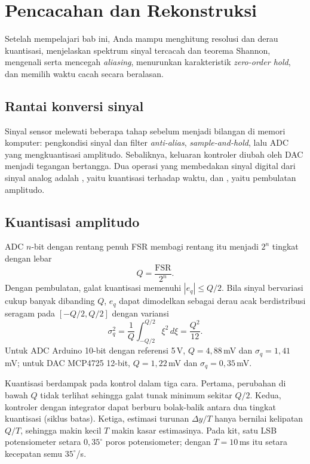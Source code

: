 \chapter{Pencacahan dan Rekonstruksi}
\label{bab:pencacahan}

\begin{tujuan}
	Setelah mempelajari bab ini, Anda mampu menghitung resolusi dan derau kuantisasi, menjelaskan spektrum sinyal tercacah dan teorema Shannon, mengenali serta mencegah \textit{aliasing}, menurunkan karakteristik \textit{zero-order hold}, dan memilih waktu cacah secara beralasan.
\end{tujuan}

\section{Rantai konversi sinyal}
Sinyal sensor melewati beberapa tahap sebelum menjadi bilangan di memori komputer: pengkondisi sinyal dan filter \textit{anti-alias}, \textit{sample-and-hold}, lalu ADC yang mengkuantisasi amplitudo. Sebaliknya, keluaran kontroler diubah oleh DAC menjadi tegangan bertangga. Dua operasi yang membedakan sinyal digital dari sinyal analog adalah , yaitu kuantisasi terhadap waktu, dan , yaitu pembulatan amplitudo.

\section{Kuantisasi amplitudo}
ADC $n$-bit dengan rentang penuh FSR membagi rentang itu menjadi $2^n$ tingkat dengan lebar
\begin{equation}
	Q = \frac{\text{FSR}}{2^n}.
\end{equation}
Dengan pembulatan, galat kuantisasi memenuhi $|e_q| \le Q/2$. Bila sinyal bervariasi cukup banyak dibanding $Q$, $e_q$ dapat dimodelkan sebagai derau acak berdistribusi seragam pada $[-Q/2, Q/2]$ dengan variansi
\begin{equation}
	\sigma_q^2 = \frac{1}{Q}\int_{-Q/2}^{Q/2}\xi^2\,d\xi = \frac{Q^2}{12}.
\end{equation}
Untuk ADC Arduino 10-bit dengan referensi 5\,V, $Q = 4{,}88$\,mV dan $\sigma_q = 1{,}41$\,mV; untuk DAC MCP4725 12-bit, $Q = 1{,}22$\,mV dan $\sigma_q = 0{,}35$\,mV.

Kuantisasi berdampak pada kontrol dalam tiga cara. Pertama, perubahan di bawah $Q$ tidak terlihat sehingga galat tunak minimum sekitar $Q/2$. Kedua, kontroler dengan integrator dapat berburu bolak-balik antara dua tingkat kuantisasi (siklus batas). Ketiga, estimasi turunan $\Delta y/T$ hanya bernilai kelipatan $Q/T$, sehingga makin kecil $T$ makin kasar estimasinya. Pada kit, satu LSB potensiometer setara $0{,}35^\circ$ poros potensiometer; dengan $T = 10$\,ms itu setara kecepatan semu $35^\circ$/s.

